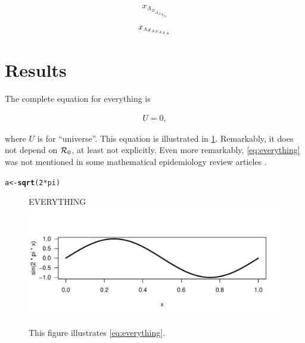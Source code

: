 \documentclass[12pt]{article}\usepackage[]{graphicx}\usepackage[]{xcolor}
\makeatletter
\def\maxwidth{ %
  \ifdim\Gin@nat@width>\linewidth
    \linewidth
  \else
    \Gin@nat@width
  \fi
}
\newcommand{\hlnum}[1]{\textcolor[rgb]{0.686,0.059,0.569}{#1}}%
\newcommand{\hlopt}[1]{\textcolor[rgb]{0,0,0}{#1}}%
\newcommand{\hlstd}[1]{\textcolor[rgb]{0.345,0.345,0.345}{#1}}%
\newcommand{\hlkwb}[1]{\textcolor[rgb]{0.69,0.353,0.396}{#1}}%
\newcommand{\hlkwd}[1]{\textcolor[rgb]{0.737,0.353,0.396}{\textbf{#1}}}%
\newenvironment{kframe}{%
 \def\at@end@of@kframe{}%
 \ifinner\ifhmode%
  \def\at@end@of@kframe{\end{minipage}}%
  \begin{minipage}{\columnwidth}%
 \fi\fi%
 \def\FrameCommand##1{\hskip\@totalleftmargin \hskip-\fboxsep
 \colorbox{shadecolor}{##1}\hskip-\fboxsep
     \hskip-\linewidth \hskip-\@totalleftmargin \hskip\columnwidth}%
 \MakeFramed {\advance\hsize-\width
   \@totalleftmargin\z@ \linewidth\hsize
   \@setminipage}}%
 {\par\unskip\endMakeFramed%
 \at@end@of@kframe}
\newenvironment{knitrout}{}{} %
\makeatother
\begin{document}
\newcommand{\tmpout}{{x_{A}}}
\begin{equation}
\tmpout_{\tmpout_{\tmpout_{\tmpout}}}
\end{equation}
\renewcommand{\tmpout}{{x_{\scaleobj{0.8}{A}}}}
\begin{equation}
\tmpout_{\tmpout_{\tmpout_{\tmpout}}}
\end{equation}

\section{Results}\label{sec:results}

The complete equation for everything is
\begin{linenomath*}
\begin{align}\label{eq:everything}
  U = 0,
\end{align}
\end{linenomath*}
where $U$ is for ``universe''.  This equation is illustrated
in \cref{fig:everything}.  Remarkably, it does not depend on ${\mathcal R}_0$,
at least not explicitly.  Even more remarkably, \cref{eq:everything}
was not mentioned in some mathematical epidemiology review articles
\cite{Earn+02,Earn04,Earn08,Earn09}.

\begin{knitrout}
\color{fgcolor}\begin{kframe}
\begin{alltt}
\hlstd{a} \hlkwb{<-} \hlkwd{sqrt}\hlstd{(}\hlnum{2}\hlopt{*}\hlstd{pi)}
\end{alltt}
\end{kframe}
\end{knitrout}

\begin{figure}
  \begin{center}
    \Huge EVERYTHING
\begin{knitrout}
\color{fgcolor}
\includegraphics[width=\maxwidth]{figure/example.figure-1} 
\end{knitrout}
  \end{center}
  \caption{This figure illustrates \cref{eq:everything}.}
  \label{fig:everything}
\end{figure}
\end{document}
